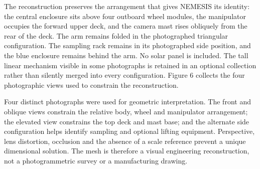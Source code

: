 \documentclass[11pt,a4paper]{article}
\begin{document}
The reconstruction preserves the arrangement that gives NEMESIS its identity: the central enclosure sits above four outboard wheel modules, the manipulator occupies the forward upper deck, and the camera mast rises obliquely from the rear of the deck. The arm remains folded in the photographed triangular configuration. The sampling rack remains in its photographed side position, and the blue enclosure remains behind the arm. No solar panel is included. The tall linear mechanism visible in some photographs is retained in an optional collection rather than silently merged into every configuration. Figure 6 collects the four photographic views used to constrain the reconstruction.

Four distinct photographs were used for geometric interpretation. The front and oblique views constrain the relative body, wheel and manipulator arrangement; the elevated view constrains the top deck and mast base; and the alternate side configuration helps identify sampling and optional lifting equipment. Perspective, lens distortion, occlusion and the absence of a scale reference prevent a unique dimensional solution. The mesh is therefore a visual engineering reconstruction, not a photogrammetric survey or a manufacturing drawing.

\FloatBarrier

\begingroup

\fontsize{9.5}{11.2}\selectfont

\renewcommand{\arraystretch}{1.16}

\setlength{\tabcolsep}{5pt}
\end{document}
